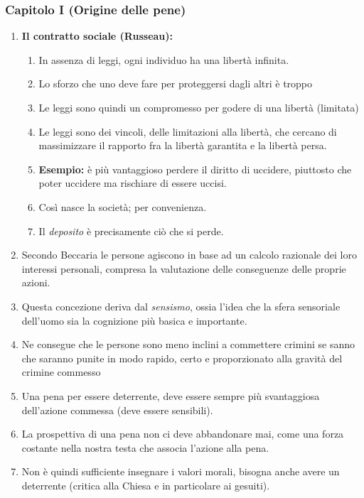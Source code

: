 \documentclass{article}
\begin{document}
\subsubsection{Capitolo I (Origine delle pene)}

\begin{enumerate}
    \item \textbf{Il contratto sociale (Russeau):}
    \begin{enumerate}
        \item In assenza di leggi, ogni individuo ha una libertà infinita.
        \item Lo sforzo che uno deve fare per proteggersi dagli altri è troppo
        \item Le leggi sono quindi un compromesso per godere di una libertà (limitata)
        \item Le leggi sono dei vincoli, delle limitazioni alla libertà, che cercano di massimizzare il rapporto fra la libertà garantita e la libertà persa.
        \item \textbf{Esempio:} è più vantaggioso perdere il diritto di uccidere, piuttosto che poter uccidere ma rischiare di essere uccisi.
        \item Così nasce la società; per convenienza.
        \item Il \textit{deposito} è precisamente ciò che si perde.
    \end{enumerate}
    \item Secondo Beccaria le persone agiscono in base ad un calcolo razionale dei loro interessi personali, compresa la valutazione delle conseguenze delle proprie azioni.
    \item Questa concezione deriva dal \textit{sensismo}, ossia l'idea che la sfera sensoriale dell'uomo sia la cognizione più basica e importante.
    \item Ne consegue che le persone sono meno inclini a commettere crimini se sanno che saranno punite in modo rapido, certo e proporzionato alla gravità del crimine commesso
    \item Una pena per essere deterrente, deve essere sempre più svantaggiosa dell'azione commessa (deve essere sensibili).
    \item La prospettiva di una pena non ci deve abbandonare mai, come una forza costante nella nostra testa che associa l'azione alla pena.
    \item Non è quindi sufficiente insegnare i valori morali, bisogna anche avere un deterrente (critica alla Chiesa e in particolare ai gesuiti).
\end{enumerate}
\end{document}
